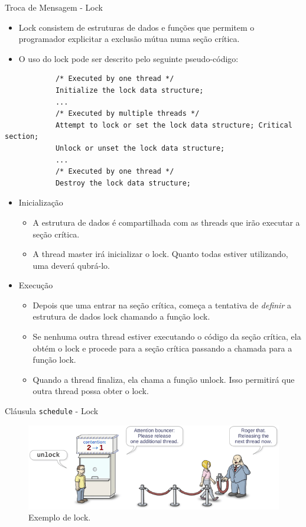 	\begin{frame}[fragile]{Troca de Mensagem -  Lock}
		\begin{itemize}
			\item Lock consistem de estruturas de dados e funções que permitem o programador explicitar a exclusão mútua numa seção crítica.
			\item O uso do lock pode ser descrito pelo seguinte pseudo-código:
		\end{itemize}
		\begin{verbatim}
			/* Executed by one thread */
			Initialize the lock data structure;
			...
			/* Executed by multiple threads */
			Attempt to lock or set the lock data structure; Critical section;
			Unlock or unset the lock data structure;
			...
			/* Executed by one thread */
			Destroy the lock data structure;
		\end{verbatim}
		\begin{itemize}
			\item Inicialização
			\begin{itemize}
				\item A estrutura de dados é compartilhada com as threads que irão executar a seção crítica.
				\item A thread master irá inicializar o lock. Quanto todas estiver utilizando, uma deverá qubrá-lo.
			\end{itemize}
			\item Execução
			\begin{itemize}
				\item Depois que uma entrar na seção crítica, começa a tentativa de \textit{definir} a estrutura de dados lock chamando a função lock.
				\item Se nenhuma outra thread estiver executando o código da seção crítica, ela obtém o lock e procede para a seção crítica passando a chamada para a função lock.
				\item Quando a thread finaliza, ela chama a função unlock. Isso permitirá que outra thread possa obter o lock.
			\end{itemize}
		\end{itemize}
\end{frame}

	\begin{frame}{Cláusula {\tt schedule} - Lock}
		\begin{figure}[p]
			\centering
			\includegraphics[width=1\textwidth]{img/pacheco/mutex.png}
			\caption{Exemplo de lock.}
		\end{figure}
	\end{frame}

